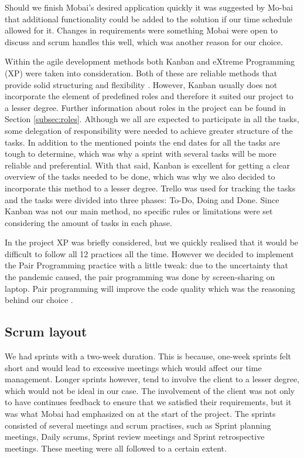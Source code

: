 Should we finish Mobai's desired application quickly it was suggested by Mo-bai that additional functionality could be added to the solution if our time schedule allowed for it. Changes in requirements were something Mobai were open to discuss and scrum handles this well, which was another reason for our choice.

Within the agile development methods both Kanban and eXtreme Programming (XP) were taken into consideration. Both of these are reliable methods that provide solid structuring and flexibility \cite{KanbanVScrum}. However, Kanban usually does not incorporate the element of predefined roles and therefore it suited our project to a lesser degree. Further information about roles in the project can be found in Section \ref{subsec:roles}. Although we all are expected to participate in all the tasks, some delegation of responsibility were needed to achieve greater structure of the tasks. In addition to the mentioned points the end dates for all the tasks are tough to determine, which was why a sprint with several tasks will be more reliable and preferential. 
With that said, Kanban is excellent for getting a clear overview of the tasks needed to be done, which was why we also decided to incorporate this method to a lesser degree. Trello \cite{Trello} was used for tracking the tasks and the tasks were divided into three phases: To-Do, Doing and Done. Since Kanban was not our main method, no specific rules or limitations were set considering the amount of tasks in each phase. 

In the project XP was briefly considered, but we quickly realised that it would be difficult to follow all 12 practices all the time. However we decided to implement the Pair Programming practice with a little tweak: due to the uncertainty that the pandemic caused, the pair programming was done by screen-sharing on laptop. Pair programming will improve the code quality which was the reasoning behind our choice \cite{eXtremeP}. 

\subsection{Scrum layout}
We had sprints with a two-week duration. This is because, one-week sprints felt short and would lead to excessive meetings which would affect our time management. Longer sprints however, tend to involve the client to a lesser degree, which would not be ideal in our case. The involvement of the client was not only to have continues feedback to ensure that we satisfied their requirements, but it was what Mobai had emphasized on at the start of the project. The sprints consisted of several meetings and scrum practises, such as Sprint planning meetings, Daily scrums, Sprint review meetings and Sprint retrospective meetings. These meeting were all followed to a certain extent. 

